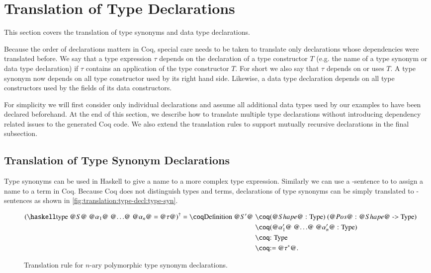 \section{Translation of Type Declarations} \label{sec:translation:type-decl}
This section covers the translation of type synonyms and data type declarations.

Because the order of declarations matters in Coq, special care needs to be taken to translate only declarations whose dependencies were translated before.
We say that a type expression $\tau$ depends on the declaration of a type constructor $T$ (e.g. the name of a type synonym or data type declaration) if $\tau$ contains an application of the type constructor $T$.
For short we also say that $\tau$ depends on or uses $T$.
A type synonym now depends on all type constructor used by its right hand side.
Likewise, a data type declaration depends on all type constructors used by the fields of its data constructors.

For simplicity we will first consider only individual declarations and assume all additional data types used by our examples to have been declared beforehand.
At the end of this section, we describe how to translate multiple type declarations without introducing dependency related issues to the generated Coq code.
We also extend the translation rules to support mutually recursive declarations in the final subsection.

\subsection{Translation of Type Synonym Declarations}
Type synonyms can be used in Haskell to give a name to a more complex type expression.
Similarly we can use a -sentence to to assign a name to a term in Coq.
Because Coq does not distinguish types and terms, declarations of type synonyms can be simply translated to -sentences as shown in \autoref{fig:translation:type-decl:type-syn}.

\begin{figure}[H]
  \begin{align*}
    \toCoq{(
      \haskellM{type @$S$@ @$\alpha_1$@ @$\ldots$@ @$\alpha_n$@ = @$\tau$@}
     )}
    = \coqM{Definition @$S'$@} &\;\coqM{(@$\Shape$@ : Type) (@$\Pos$@ : @$\Shape$@ -> Type)           } \\
                               &\;\coqM{(@$\alpha_1'$@ @$\ldots$@ @$\alpha_n'$@ : Type)} \\
                               &\;\coqM{: Type                                         } \\
                               &\;\coqM{:= @${\tau}^{*}$@.                             } %
  \end{align*}
  \caption{Translation rule for $n$-ary polymorphic type synonym declarations.}
  \label{fig:translation:type-decl:type-syn}
\end{figure}

